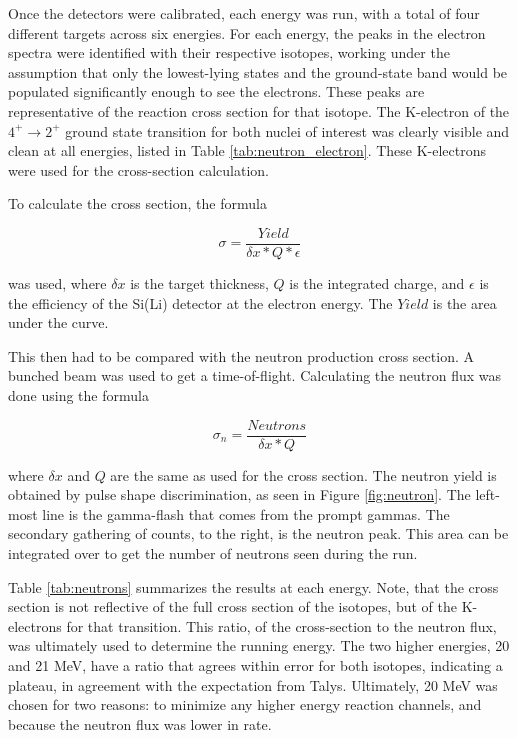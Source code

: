 

Once the detectors were calibrated, each energy was run, with a total of four different targets across six energies. For each energy, the peaks in the electron spectra were identified with their respective isotopes, working under the assumption that only the lowest-lying states and the ground-state band would be populated significantly enough to see the electrons. These peaks are representative of the reaction cross section for that isotope. The K-electron of the $4^+\rightarrow2^+$ ground state transition for both nuclei of interest was clearly visible and clean at all energies, listed in Table \ref{tab:neutron_electron}. These K-electrons were used for the cross-section calculation.



To calculate the cross section, the formula

\begin{equation}
    \sigma=\frac{Yield}{\delta x*Q*\epsilon}
    \label{eq:xs}
\end{equation}

was used, where $\delta x$ is the target thickness, $Q$ is the integrated charge, and $\epsilon$ is the efficiency of the Si(Li) detector at the electron energy. The $Yield$ is the area under the curve.

This then had to be compared with the neutron production cross section. A bunched beam was used to get a time-of-flight. Calculating the neutron flux was done using the formula

\begin{equation}
    \sigma_n = \frac{Neutrons}{\delta x*Q}
\end{equation}

where $\delta x$ and $Q$ are the same as used for the cross section. The neutron yield is obtained by pulse shape discrimination, as seen in Figure \ref{fig:neutron}. The left-most line is the gamma-flash that comes from the prompt gammas. The secondary gathering of counts, to the right, is the neutron peak. This area can be integrated over to get the number of neutrons seen during the run.

Table \ref{tab:neutrons} summarizes the results at each energy. Note, that the cross section is not reflective of the full cross section of the isotopes, but of the K-electrons for that transition. This ratio, of the cross-section to the neutron flux, was ultimately used to determine the running energy. The two higher energies, 20 and 21 MeV, have a ratio that agrees within error for both isotopes, indicating a plateau, in agreement with the expectation from Talys. Ultimately, 20 MeV was chosen for two reasons: to minimize any higher energy reaction channels, and because the neutron flux was lower in rate.


